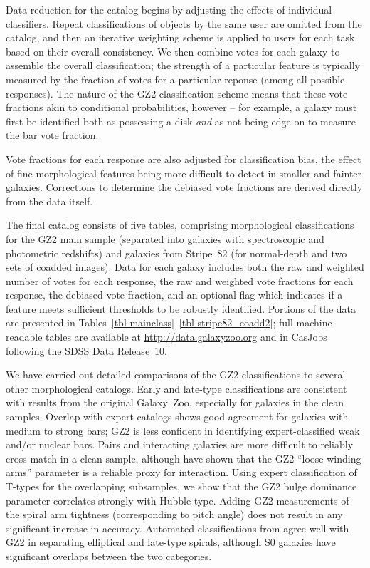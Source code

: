 \documentclass[useAMS,usenatbib]{mn2e}
\begin{document}
Data reduction for the catalog begins by adjusting the effects of individual classifiers. Repeat classifications of objects by the same user are omitted from the catalog, and then an iterative weighting scheme is applied to users for each task based on their overall consistency. We then combine votes for each galaxy to assemble the overall classification; the strength of a particular feature is typically measured by the fraction of votes for a particular reponse (among all possible responses). The nature of the GZ2 classification scheme means that these vote fractions akin to conditional probabilities, however -- for example, a galaxy must first be identified both as possessing a disk {\em and} as not being edge-on to measure the bar vote fraction.

Vote fractions for each response are also adjusted for classification bias, the effect of fine morphological features being more difficult to detect in smaller and fainter galaxies. Corrections to determine the debiased vote fractions are derived directly from the data itself. 

The final catalog consists of five tables, comprising morphological classifications for the GZ2 main sample (separated into galaxies with spectroscopic and photometric redshifts) and galaxies from Stripe~82 (for normal-depth and two sets of coadded images). Data for each galaxy includes both the raw and weighted number of votes for each response, the raw and weighted vote fractions for each response, the debiased vote fraction, and an optional flag which indicates if a feature meets sufficient thresholds to be robustly identified. Portions of the data are presented in Tables~\ref{tbl-mainclass}--\ref{tbl-stripe82_coadd2}; full machine-readable tables are available at \url{http://data.galaxyzoo.org} and in CasJobs following the SDSS Data Release~10. 

We have carried out detailed comparisons of the GZ2 classifications to several other morphological catalogs. Early and late-type classifications are consistent with results from the original Galaxy~Zoo, especially for galaxies in the clean samples. Overlap with expert catalogs \citep{nai10,bai11} shows good agreement for galaxies with medium to strong bars; GZ2 is less confident in identifying expert-classified weak and/or nuclear bars. Pairs and interacting galaxies are more difficult to reliably cross-match in a clean sample, although \citet{cas13} have shown that the GZ2 ``loose winding arms'' parameter is a reliable proxy for interaction. Using expert classification of T-types for the overlapping subsamples, we show that the GZ2 bulge dominance parameter correlates strongly with Hubble type. Adding GZ2 measurements of the spiral arm tightness (corresponding to pitch angle) does not result in any significant increase in accuracy. Automated classifications from \citet{hue11} agree well with GZ2 in separating elliptical and late-type spirals, although S0 galaxies have significant overlaps between the two categories. 
\end{document}
